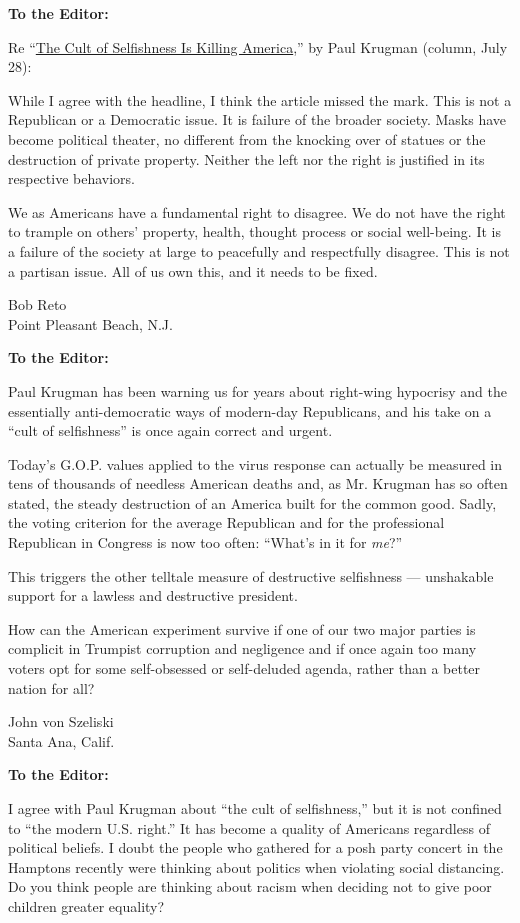 \textbf{To the Editor:}

Re
``\href{https://www.nytimes.com/2020/07/27/opinion/us-republicans-coronavirus.html}{The
Cult of Selfishness Is Killing America},'' by Paul Krugman (column, July
28):

While I agree with the headline, I think the article missed the mark.
This is not a Republican or a Democratic issue. It is failure of the
broader society. Masks have become political theater, no different from
the knocking over of statues or the destruction of private property.
Neither the left nor the right is justified in its respective behaviors.

We as Americans have a fundamental right to disagree. We do not have the
right to trample on others' property, health, thought process or social
well-being. It is a failure of the society at large to peacefully and
respectfully disagree. This is not a partisan issue. All of us own this,
and it needs to be fixed.

Bob Reto\\
Point Pleasant Beach, N.J.

\textbf{To the Editor:}

Paul Krugman has been warning us for years about right-wing hypocrisy
and the essentially anti-democratic ways of modern-day Republicans, and
his take on a ``cult of selfishness'' is once again correct and urgent.

Today's G.O.P. values applied to the virus response can actually be
measured in tens of thousands of needless American deaths and, as Mr.
Krugman has so often stated, the steady destruction of an America built
for the common good. Sadly, the voting criterion for the average
Republican and for the professional Republican in Congress is now too
often: ``What's in it for \emph{me}?''

This triggers the other telltale measure of destructive selfishness ---
unshakable support for a lawless and destructive president.

How can the American experiment survive if one of our two major parties
is complicit in Trumpist corruption and negligence and if once again too
many voters opt for some self-obsessed or self-deluded agenda, rather
than a better nation for all?

John von Szeliski\\
Santa Ana, Calif.

\textbf{To the Editor:}

I agree with Paul Krugman about ``the cult of selfishness,'' but it is
not confined to ``the modern U.S. right.'' It has become a quality of
Americans regardless of political beliefs. I doubt the people who
gathered for a posh party concert in the Hamptons recently were thinking
about politics when violating social distancing. Do you think people are
thinking about racism when deciding not to give poor children greater
equality?

